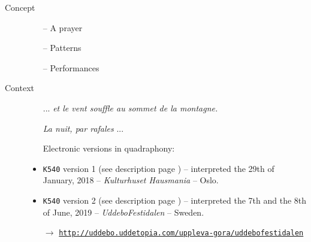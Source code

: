 \begin{description}
\item[Concept] \hfill 
\begin{itemize}
\item[--] A prayer
\item[--] Patterns
\item[--] Performances
\end{itemize}
\bigskip
\item[Context] \hfill 
\begin{itemize}
\item[] ... \textit{et le vent souffle au sommet de la montagne.} 

\textit{La nuit, par rafales} ...
\item[]
\item[] Electronic versions in quadraphony:
\item \texttt{K540} version 1 (see description page \pageref{k540v1}) -- interpreted the 29th of January, 2018 -- \textit{Kulturhuset Hausmania} -- Oslo.
\item \texttt{K540} version 2 (see description page \pageref{k540v2}) -- interpreted the 7th and the 8th of June, 2019 -- \textit{UddeboFestidalen} -- Sweden.

$\rightarrow$ \href{http://uddebo.uddetopia.com/uppleva-gora/uddebofestidalen}{\texttt{\small http://uddebo.uddetopia.com/uppleva-gora/uddebofestidalen}}


\end{itemize}
\end{description}
